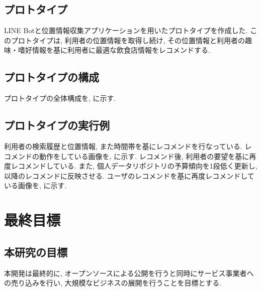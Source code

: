 \documentclass[a4j,twocolumn]{jsarticle}
\begin{document}
\subsection{プロトタイプ}
LINE Botと位置情報収集アプリケーションを用いたプロトタイプを作成した.
このプロトタイプは, 利用者の位置情報を取得し続け, その位置情報と利用者の趣味・嗜好情報を基に利用者に最適な飲食店情報をレコメンドする.

\subsection{プロトタイプの構成}
プロトタイプの全体構成を, に示す.

\subsection{プロトタイプの実行例}
利用者の検索履歴と位置情報, また時間帯を基にレコメンドを行なっている.
レコメンドの動作をしている画像を, に示す.
レコメンド後, 利用者の要望を基に再度レコメンドしている.
また, 個人データリポジトリの予算傾向を1段低く更新し, 以降のレコメンドに反映させる.
ユーザのレコメンドを基に再度レコメンドしている画像を, に示す.


\section{最終目標}
\subsection{本研究の目標}
本開発は最終的に, オープンソースによる公開を行うと同時にサービス事業者への売り込みを行い, 大規模なビジネスの展開を行うことを目標とする.



\begin{thebibliography}{99}
\end{thebibliography} 
\end{document}
